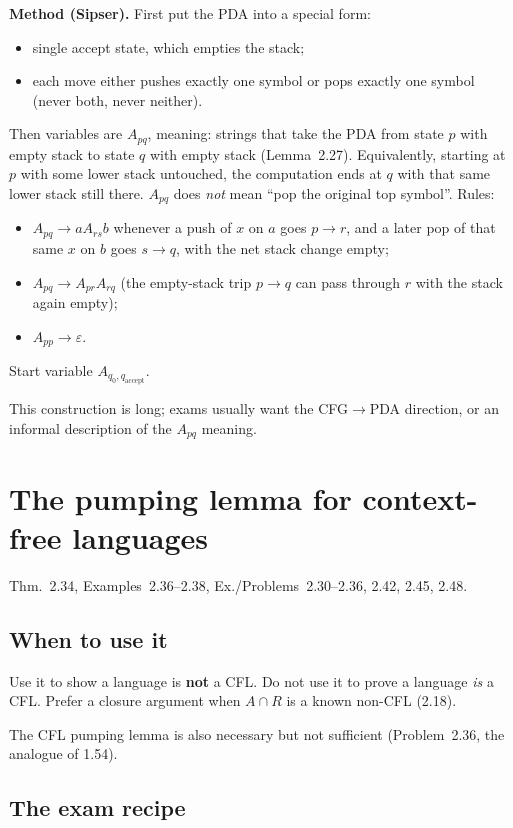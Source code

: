 \documentclass[11pt,a4paper]{article}
\newcommand{\eps}{\varepsilon}
\begin{document}
\textbf{Method (Sipser).}
First put the PDA into a special form:
\begin{itemize}[nosep]
  \item single accept state, which empties the stack;
  \item each move either pushes exactly one symbol or pops exactly
        one symbol (never both, never neither).
\end{itemize}
Then variables are $A_{pq}$, meaning: strings that take the PDA
from state $p$ with empty stack to state $q$ with empty stack
(Lemma~2.27). Equivalently, starting at $p$ with some lower stack
untouched, the computation ends at $q$ with that same lower stack
still there. $A_{pq}$ does \emph{not} mean ``pop the original top
symbol''.
Rules:
\begin{itemize}[nosep]
  \item $A_{pq}\to a A_{rs} b$ whenever a push of $x$ on $a$ goes
        $p\to r$, and a later pop of that same $x$ on $b$ goes
        $s\to q$, with the net stack change empty;
  \item $A_{pq}\to A_{pr}A_{rq}$ (the empty-stack trip $p\to q$
        can pass through $r$ with the stack again empty);
  \item $A_{pp}\to\eps$.
\end{itemize}
Start variable $A_{q_0,q_{\mathrm{accept}}}$.

This construction is long; exams usually want the CFG$\to$PDA
direction, or an informal description of the $A_{pq}$ meaning.

\section{The pumping lemma for context-free languages}
\label{type:pump-cfl}

Thm.~2.34, Examples~2.36--2.38, Ex./Problems~2.30--2.36, 2.42,
2.45, 2.48.

\subsection{When to use it}

Use it to show a language is \textbf{not} a CFL. Do not use it to
prove a language \emph{is} a CFL. Prefer a closure argument when
$A\cap R$ is a known non-CFL (2.18).

The CFL pumping lemma is also necessary but not sufficient
(Problem~2.36, the analogue of 1.54).

\subsection{The exam recipe}
\end{document}
